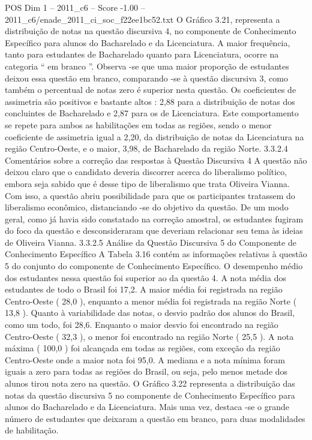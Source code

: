\begin{textsample}{POS Dim 1 – 2011\_c6 – Score -1.00 – 2011\_c6/enade\_2011\_ci\_soc\_f22ee1bc52.txt}
O Gráfico 3.21, representa a distribuição de notas na questão discursiva 4, no componente de Conhecimento Específico para alunos do Bacharelado e da Licenciatura.
A maior frequência, tanto para estudantes de Bacharelado quanto para Licenciatura, ocorre na categoria “ em branco ”.
Observa -se que uma maior proporção de estudantes deixou essa questão em branco, comparando -se à questão discursiva 3, como também o percentual de notas zero é superior nesta questão.
Os coeficientes de assimetria são positivos e bastante altos : 2,88 para a distribuição de notas dos concluintes de Bacharelado e 2,87 para os de Licenciatura.
Este comportamento se repete para ambos as habilitações em todas as regiões, sendo o menor coeficiente de assimetria igual a 2,20, da distribuição de notas da Licenciatura na região Centro-Oeste, e o maior, 3,98, de Bacharelado da região Norte. 3.3.2.4 Comentários sobre a correção das respostas à Questão Discursiva 4 A questão não deixou claro que o candidato deveria discorrer acerca do liberalismo político, embora seja sabido que é desse tipo de liberalismo que trata Oliveira Vianna.
Com isso, a questão abriu possibilidade para que os participantes tratassem do liberalismo econômico, distanciando -se do objetivo da questão.
De um modo geral, como já havia sido constatado na correção amostral, os estudantes fugiram do foco da questão e desconsideraram que deveriam relacionar seu tema às ideias de Oliveira Vianna. 3.3.2.5 Análise da Questão Discursiva 5 do Componente de Conhecimento Específico A Tabela 3.16 contém as informações relativas à questão 5 do conjunto do componente de Conhecimento Específico.
O desempenho médio dos estudantes nessa questão foi superior ao da questão 4.
A nota média dos estudantes de todo o Brasil foi 17,2.
A maior média foi registrada na região Centro-Oeste ( 28,0 ), enquanto a menor média foi registrada na região Norte ( 13,8 ).
Quanto à variabilidade das notas, o desvio padrão dos alunos do Brasil, como um todo, foi 28,6.
Enquanto o maior desvio foi encontrado na região Centro-Oeste ( 32,3 ), o menor foi encontrado na região Norte ( 25,5 ).
A nota máxima ( 100,0 ) foi alcançada em todas as regiões, com exceção da região Centro-Oeste onde a maior nota foi 95,0.
A mediana e a nota mínima foram iguais a zero para todas as regiões do Brasil, ou seja, pelo menos metade dos alunos tirou nota zero na questão.
O Gráfico 3.22 representa a distribuição das notas da questão discursiva 5 no componente de Conhecimento Específico para alunos do Bacharelado e da Licenciatura.
Mais uma vez, destaca -se o grande número de estudantes que deixaram a questão em branco, para duas modalidades de habilitação.

\end{textsample}
